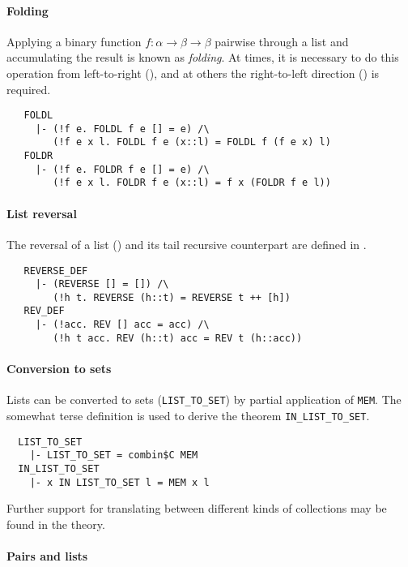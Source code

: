 \paragraph {Folding}

Applying a binary function $f : \alpha\to\beta\to\beta$ pairwise
through a list and accumulating the result is known as
\emph{folding}. At times, it is necessary to do this operation
from left-to-right (), and at others the
right-to-left direction () is required.
%
{\small
\begin{verbatim}
   FOLDL
     |- (!f e. FOLDL f e [] = e) /\
        (!f e x l. FOLDL f e (x::l) = FOLDL f (f e x) l)
   FOLDR
     |- (!f e. FOLDR f e [] = e) /\
        (!f e x l. FOLDR f e (x::l) = f x (FOLDR f e l))
\end{verbatim}
}

\paragraph {List reversal}

The reversal of a list () and its tail recursive
counterpart  are defined in .
{\small
\begin{verbatim}
   REVERSE_DEF
     |- (REVERSE [] = []) /\
        (!h t. REVERSE (h::t) = REVERSE t ++ [h])
   REV_DEF
     |- (!acc. REV [] acc = acc) /\
        (!h t acc. REV (h::t) acc = REV t (h::acc))
\end{verbatim}
}

\paragraph {Conversion to sets}

Lists can be converted to sets ({\small\verb+LIST_TO_SET+}) by
partial application of {\small\verb+MEM+}. The somewhat
terse definition is used to derive the theorem
{\small\verb+IN_LIST_TO_SET+}.
%
{\small
\begin{verbatim}
  LIST_TO_SET
    |- LIST_TO_SET = combin$C MEM
  IN_LIST_TO_SET
    |- x IN LIST_TO_SET l = MEM x l
\end{verbatim}
}
%
Further support for translating between different kinds of
collections may be found in the  theory.

\paragraph {Pairs and lists}

